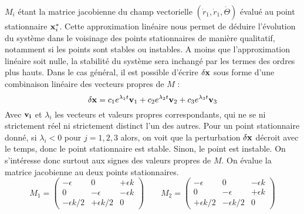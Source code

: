 %
$M_i$ étant la matrice jacobienne du champ vectorielle $(\dot{r}_1, \dot{r}_1, \dot{\Theta})$ évalué au point stationnaire $\vb{x}^*_i$.
%
Cette approximation linéaire nous permet de déduire l'évolution du système dans le voisinage des points stationnaires de manière qualitatif, notamment si les points sont stables ou instables. 
A moins que l'approximation linéaire soit nulle, la stabilité du système sera inchangé par les termes des ordres plus hauts.
%
%
%
Dans le cas général, il est possible d'écrire $\delta\vb{x}$ sous forme d'une combinaison linéaire des vecteurs propres de $M$ :
%
\[ \delta\vb{x} = c_1 e^{\lambda_1 t}\vb{v}_1 + c_2 e^{\lambda_2 t}\vb{v}_2 + c_3 e^{\lambda_3 t}\vb{v}_3\]
%
Avec $\vb{v_i}$ et $\lambda_i$ les vecteurs et valeurs propres correspondants, qui ne se ni strictement réel ni strictement distinct l'un des autres.
%
Pour un point stationnaire donné, si $\lambda_i < 0$ pour $j = 1, 2, 3$ alors, on voit que la perturbation $\delta\vb{x}$ décroit avec le temps, donc le point stationnaire est stable. Sinon, le point est instable.
%
On s'intéresse donc surtout aux signes des valeurs propres de $M$.
%
On évalue la matrice jacobienne au deux points stationnaires.
%
\begin{equation}
    M_1 = \begin{pmatrix}
             -\epsilon & 0 & +\epsilon k \\
             0 & -\epsilon & -\epsilon k \\
            -\epsilon k/2 & +\epsilon k/2 & 0
         \end{pmatrix}
    \qquad
    M_2 = \begin{pmatrix}
             -\epsilon & 0 & -\epsilon k \\
             0 & -\epsilon & +\epsilon k \\
             +\epsilon k/2 & -\epsilon k/2 & 0
         \end{pmatrix}
\end{equation}
%
